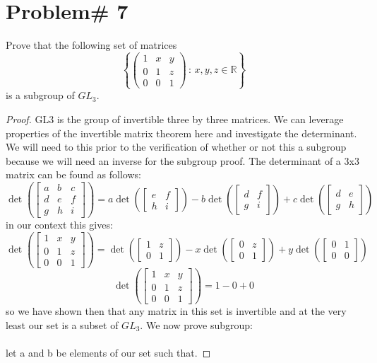 \documentclass[11pt]{article}
\theoremstyle{definition}  %
\newcommand{\R}{\mathbb{R}}
\begin{document}
\section* {Problem# 7}Prove that the following set of matrices
  $$ \left\{ \left( \begin{array}{ccc} 1 & x & y \\ 0 & 1 & z  \\ 0 & 0 & 1 \end{array} \right) \, : \,  x, y, z \in \R \right\} $$
  is a subgroup of $GL_3$.
  \begin{proof}
    GL3 is the group of invertible three by three matrices. We can leverage properties of the invertible matrix theorem here and investigate the determinant. We will need to this prior to the verification of whether or not this a subgroup because we will need an inverse for the subgroup proof. The determinant of a 3x3 matrix can be found as follows:
    \[
      \det\left(\begin{bmatrix}
        a&b&c\\d&e&f\\g&h&i
    \end{bmatrix}\right)=a\det\left(\begin{bmatrix}
      e&f\\h&i
    \end{bmatrix}\right)-b\det\left(\begin{bmatrix}
      d&f\\g&i
    \end{bmatrix}\right)+
    c\det\left(\begin{bmatrix}
      d&e\\g&h
    \end{bmatrix}\right)
    \]
    in our context this gives:
    \[
      \det\left(\begin{bmatrix}
      1 & x & y \\ 0 & 1 & z  \\ 0 & 0 & 1
    \end{bmatrix}\right)=\det\left(\begin{bmatrix}
      1&z\\0&1
    \end{bmatrix}\right)-x\det\left(\begin{bmatrix}
      0&z\\0&1
    \end{bmatrix}\right)+
    y\det\left(\begin{bmatrix}
      0&1\\0&0
    \end{bmatrix}\right)
    \]
    \[
    \det\left(\begin{bmatrix}
    1 & x & y \\ 0 & 1 & z  \\ 0 & 0 & 1
  \end{bmatrix}\right)=1-0+0
    \]
    so we have shown then that any matrix in this set is invertible and at the very least our set is a subset of $GL_3$. We now prove subgroup:\\\\
    let a and b be elements of our set such that.


\end{proof}
\end{document}
